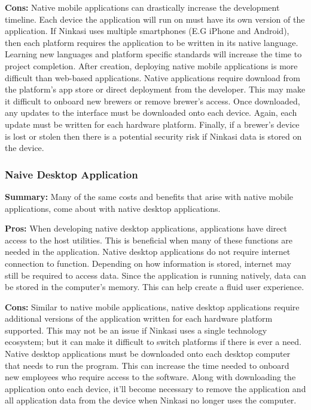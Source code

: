 \documentclass[draftclsnofoot,onecolumn,letterpaper,10pt,compsoc]{IEEEtran}
\begin{document}
		        \noindent \textbf{Cons:}
		            Native mobile applications can drastically increase the development timeline.
		            Each device the application will run on must have its own version of the application.
		            If Ninkasi uses multiple smartphones (E.G iPhone and Android), then each platform requires the application to be written in its native language.
		            Learning new languages and platform specific standards will increase the time to project completion.
		            After creation, deploying native mobile applications is more difficult than web-based applications.
		            Native applications require download from the platform's app store or direct deployment from the developer.
		            This may make it difficult to onboard new brewers or remove brewer's access.
		            Once downloaded, any updates to the interface must be downloaded onto each device.
		            Again, each update must be written for each hardware platform.
		            Finally, if a brewer's device is lost or stolen then there is a potential security risk if Ninkasi data is stored on the device.


  			\subsubsection{Naive Desktop Application}
		        \textbf{Summary:}
		            Many of the same costs and benefits that arise with native mobile applications, come about with native desktop applications.

		        \noindent \textbf{Pros:}
		            When developing native desktop applications, applications have direct access to the host utilities.
		            This is beneficial when many of these functions are needed in the application.
		            Native desktop applications do not require internet connection to function.
		            Depending on how information is stored, internet may still be required to access data.
		            Since the application is running natively, data can be stored in the computer's memory.
		            This can help create a fluid user experience.

		        \noindent \textbf{Cons:}
		            Similar to native mobile applications, native desktop applications require additional versions of the application written for each hardware platform supported.
		            This may not be an issue if Ninkasi uses a single technology ecosystem; but it can make it difficult to switch platforms if there is ever a need.
		            Native desktop applications must be downloaded onto each desktop computer that needs to run the program.
		            This can increase the time needed to onboard new employees who require access to the software.
		            Along with downloading the application onto each device, it'll become necessary to remove the application and all application data from the device when Ninkasi no longer uses the computer.
\end{document}

